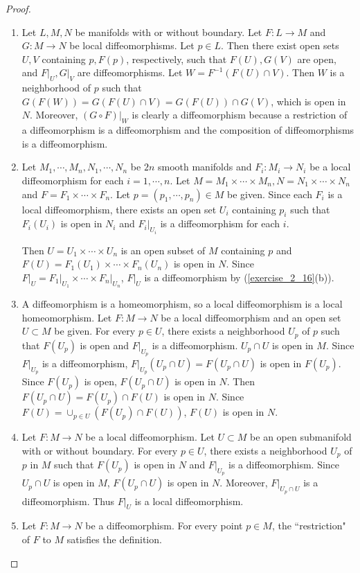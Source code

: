 \begin{proof}
  $ $
  \begin{enumerate}[label=(\alph*)]
    \item 
      Let $L, M, N$ be manifolds with or without boundary.
      Let $F: L \rightarrow M$ and $G: M \rightarrow N$ be local diffeomorphisms.
      Let $p \in L$.
      Then there exist open sets $U, V$ containing $p, F(p)$, respectively, such that $F(U), G(V)$ are open, and $F\vert_U, G\vert_V$ are diffeomorphisms.
      Let $W = F^{-1}(F(U) \cap V)$.
      Then $W$ is a neighborhood of $p$ such that $G(F(W)) = G(F(U) \cap V) = G(F(U)) \cap G(V)$, which is open in $N$.
      Moreover, $(G \circ F)\vert_{W}$ is clearly a diffeomorphism because a restriction of a diffeomorphism is a diffeomorphism and the composition of diffeomorphisms is a diffeomorphism.
    \item
      Let $M_1, \cdots, M_n, N_1, \cdots, N_n$ be $2n$ smooth manifolds and $F_i: M_i \rightarrow N_i$ be a local diffeomorphism for each $i = 1, \cdots, n$.
      Let $M = M_1 \times \cdots \times M_n, N = N_1 \times \cdots \times N_n$ and $F = F_1 \times \cdots \times F_n$.
      Let $p = (p_1, \cdots, p_n) \in M$ be given.
      Since each $F_i$ is a local diffeomorphism, there exists an open set $U_i$ containing $p_i$ such that $F_i(U_i)$ is open in $N_i$ and $F_i\vert_{U_i}$ is a diffeomorphism for each $i$.

      Then $U = U_1 \times \cdots \times U_n$ is an open subset of $M$ containing $p$ and $F(U) = F_1(U_1) \times \cdots \times F_n(U_n)$ is open in $N$.
      Since $F\vert_U = F_1\vert_{U_1} \times \cdots \times F_n\vert_{U_n}$, $F\vert_U$ is a diffeomorphism by (\ref{exercise_2_16}(b)).
    \item
      A diffeomorphism is a homeomorphism, so a local diffeomorphism is a local homeomorphism.
      Let $F: M \rightarrow N$ be a local diffeomorphism and an open set $U \subset M$ be given.
      For every $p \in U$, there exists a neighborhood $U_p$ of $p$ such that $F(U_p)$ is open and $F\vert_{U_p}$ is a diffeomorphism.
      $U_p \cap U$ is open in $M$.
      Since $F\vert_{U_p}$ is a diffeomorphism, $F\vert_{U_p}(U_p \cap U) = F(U_p \cap U)$ is open in $F(U_p)$.
      Since $F(U_p)$ is open, $F(U_p \cap U)$ is open in $N$.
      Then $F(U_p \cap U) = F(U_p) \cap F(U)$ is open in $N$.
      Since $F(U) = \cup_{p \in U} (F(U_p) \cap F(U))$, $F(U)$ is open in $N$.
    \item
      Let $F:M \rightarrow N$ be a local diffeomorphism.
      Let $U \subset M$ be an open submanifold with or without boundary.
      For every $p \in U$, there exists a neighborhood $U_p$ of $p$ in $M$ such that $F(U_p)$ is open in $N$ and $F\vert_{U_p}$ is a diffeomorphism.
      Since $U_p \cap U$ is open in $M$, $F(U_p \cap U)$ is open in $N$.
      Moreover, $F\vert_{U_p \cap U}$ is a diffeomorphism.
      Thus $F\vert_{U}$ is a local diffeomorphism.
    \item
      Let $F:M \rightarrow N$ be a diffeomorphism.
      For every point $p \in M$, the ``restriction" of $F$ to $M$ satisfies the definition.
  \end{enumerate}
\end{proof}
